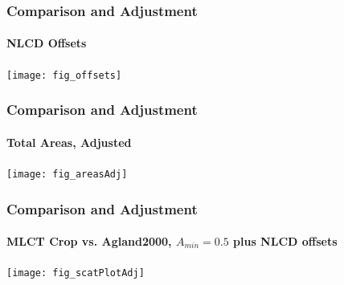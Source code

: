 \documentclass{beamer}
\begin{document}
\begin{frame}
  \frametitle{Comparison and Adjustment}
  \framesubtitle{NLCD Offsets}
  \begin{center}
    \texttt{[image: fig\_offsets]}    
  \end{center}
\end{frame}

\begin{frame}
  \frametitle{Comparison and Adjustment}
  \framesubtitle{Total Areas, Adjusted}
  \begin{center}
    \texttt{[image: fig\_areasAdj]}    
  \end{center}
\end{frame}



\begin{frame}
  \frametitle{Comparison and Adjustment}
  \framesubtitle{MLCT Crop vs. Agland2000, $A_{min}=0.5$ plus NLCD offsets}
  \begin{center}
    \texttt{[image: fig\_scatPlotAdj]}    
  \end{center}
\end{frame}






\end{document}
